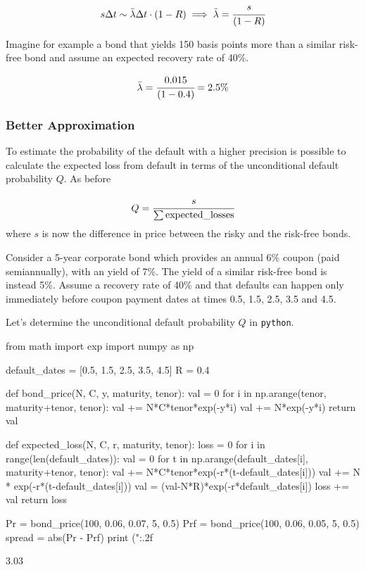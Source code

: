 \begin{equation}
s \Delta t \sim \bar{\lambda}\Delta t\cdot(1-R) \implies \bar{\lambda} = \cfrac{s}{(1-R)}
\end{equation}

Imagine for example a bond that yields 150 basis points more than a similar risk-free bond and assume an expected recovery rate of 40\%.

\begin{equation*}
\bar{\lambda} = \cfrac{0.015}{(1-0.4)} = 2.5\%
\end{equation*}

\subsubsection{Better Approximation}

To estimate the probability of the default with a higher precision is possible to calculate the expected loss from default in terms of the unconditional default probability $Q$. As before

\begin{equation}
Q = \cfrac{s}{\sum\mathrm{expected\_losses}}
\end{equation}
where $s$ is now the difference in price between the risky and the risk-free bonds.

Consider a 5-year corporate bond which provides an annual 6\% coupon (paid semiannually), with an yield of 7\%. The yield of a similar risk-free bond is instead 5\%. Assume a recovery rate of 40\% and that defaults can happen only immediately before coupon payment dates at times 0.5, 1.5, 2.5, 3.5 and 4.5. 

Let's determine the unconditional default probability $Q$ in \texttt{python}.

\begin{ipython}
from math import exp
import numpy as np

default_dates = [0.5, 1.5, 2.5, 3.5, 4.5]
R = 0.4

def bond_price(N, C, y, maturity, tenor):
    val = 0
    for i in np.arange(tenor, maturity+tenor, tenor):
        val += N*C*tenor*exp(-y*i)
    val += N*exp(-y*i)
    return val

def expected_loss(N, C, r, maturity, tenor):
    loss = 0
    for i in range(len(default_dates)):
        val = 0
        for t in np.arange(default_dates[i], maturity+tenor, tenor):
            val += N*C*tenor*exp(-r*(t-default_dates[i]))
        val += N * exp(-r*(t-default_dates[i]))
        val = (val-N*R)*exp(-r*default_dates[i])
        loss += val
    return loss

Pr = bond_price(100, 0.06, 0.07, 5, 0.5)
Prf = bond_price(100, 0.06, 0.05, 5, 0.5)
spread = abs(Pr - Prf)
print ("{:.2f}%
\end{ipython}
\begin{ioutput}
3.03%
\end{ioutput}

